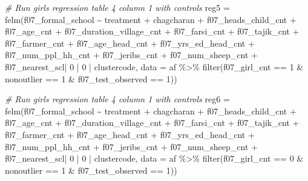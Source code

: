 \documentclass[
]{article}
\newenvironment{Shaded}{\begin{snugshade}}{\end{snugshade}}
\newcommand{\AttributeTok}[1]{\textcolor[rgb]{0.77,0.63,0.00}{#1}}
\newcommand{\CommentTok}[1]{\textcolor[rgb]{0.56,0.35,0.01}{\textit{#1}}}
\newcommand{\DecValTok}[1]{\textcolor[rgb]{0.00,0.00,0.81}{#1}}
\newcommand{\FunctionTok}[1]{\textcolor[rgb]{0.00,0.00,0.00}{#1}}
\newcommand{\NormalTok}[1]{#1}
\newcommand{\OtherTok}[1]{\textcolor[rgb]{0.56,0.35,0.01}{#1}}
\newcommand{\SpecialCharTok}[1]{\textcolor[rgb]{0.00,0.00,0.00}{#1}}
\begin{document}
\begin{Shaded}
\begin{Highlighting}[]
\CommentTok{\# Run girls regression table 4 column 1 with controls}
\NormalTok{reg5 }\OtherTok{=} \FunctionTok{felm}\NormalTok{(f07\_formal\_school }\SpecialCharTok{\textasciitilde{}}\NormalTok{ treatment }\SpecialCharTok{+}\NormalTok{ chagcharan }\SpecialCharTok{+}\NormalTok{ f07\_heads\_child\_cnt }\SpecialCharTok{+} 
\NormalTok{              f07\_age\_cnt }\SpecialCharTok{+}\NormalTok{ f07\_duration\_village\_cnt }\SpecialCharTok{+} 
\NormalTok{              f07\_farsi\_cnt }\SpecialCharTok{+}\NormalTok{ f07\_tajik\_cnt }\SpecialCharTok{+}\NormalTok{ f07\_farmer\_cnt }\SpecialCharTok{+} 
\NormalTok{              f07\_age\_head\_cnt }\SpecialCharTok{+}\NormalTok{ f07\_yrs\_ed\_head\_cnt }\SpecialCharTok{+}\NormalTok{ f07\_num\_ppl\_hh\_cnt }\SpecialCharTok{+} 
\NormalTok{              f07\_jeribs\_cnt }\SpecialCharTok{+}\NormalTok{ f07\_num\_sheep\_cnt }\SpecialCharTok{+} 
\NormalTok{              f07\_nearest\_scl}\SpecialCharTok{|} \DecValTok{0} \SpecialCharTok{|} \DecValTok{0} \SpecialCharTok{|}\NormalTok{ clustercode, }
            \AttributeTok{data =}\NormalTok{ af }\SpecialCharTok{\%\textgreater{}\%} \FunctionTok{filter}\NormalTok{(f07\_girl\_cnt }\SpecialCharTok{==} \DecValTok{1} \SpecialCharTok{\&} 
\NormalTok{                                 nonoutlier }\SpecialCharTok{==} \DecValTok{1} \SpecialCharTok{\&}
\NormalTok{                                 f07\_test\_observed }\SpecialCharTok{==} \DecValTok{1}\NormalTok{))}

\CommentTok{\# Run girls regression table 4 column 1 with controls}
\NormalTok{reg6 }\OtherTok{=} \FunctionTok{felm}\NormalTok{(f07\_formal\_school }\SpecialCharTok{\textasciitilde{}}\NormalTok{ treatment }\SpecialCharTok{+}\NormalTok{ chagcharan }\SpecialCharTok{+}\NormalTok{ f07\_heads\_child\_cnt }\SpecialCharTok{+} 
\NormalTok{              f07\_age\_cnt }\SpecialCharTok{+}\NormalTok{ f07\_duration\_village\_cnt }\SpecialCharTok{+} 
\NormalTok{              f07\_farsi\_cnt }\SpecialCharTok{+}\NormalTok{ f07\_tajik\_cnt }\SpecialCharTok{+}\NormalTok{ f07\_farmer\_cnt }\SpecialCharTok{+} 
\NormalTok{              f07\_age\_head\_cnt }\SpecialCharTok{+}\NormalTok{ f07\_yrs\_ed\_head\_cnt }\SpecialCharTok{+}\NormalTok{ f07\_num\_ppl\_hh\_cnt }\SpecialCharTok{+} 
\NormalTok{              f07\_jeribs\_cnt }\SpecialCharTok{+}\NormalTok{ f07\_num\_sheep\_cnt }\SpecialCharTok{+} 
\NormalTok{              f07\_nearest\_scl}\SpecialCharTok{|} \DecValTok{0} \SpecialCharTok{|} \DecValTok{0} \SpecialCharTok{|}\NormalTok{ clustercode, }
            \AttributeTok{data =}\NormalTok{ af }\SpecialCharTok{\%\textgreater{}\%} \FunctionTok{filter}\NormalTok{(f07\_girl\_cnt }\SpecialCharTok{==} \DecValTok{0} \SpecialCharTok{\&} 
\NormalTok{                                 nonoutlier }\SpecialCharTok{==} \DecValTok{1} \SpecialCharTok{\&}
\NormalTok{                                 f07\_test\_observed }\SpecialCharTok{==} \DecValTok{1}\NormalTok{))}


\end{Highlighting}
\end{Shaded}
\end{document}
